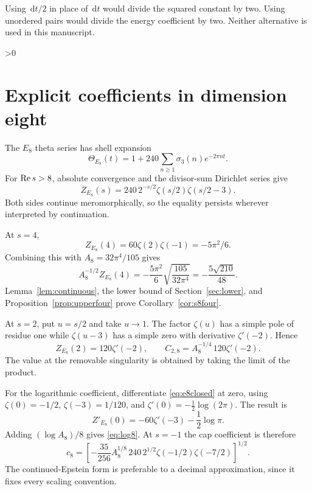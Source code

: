 \documentclass[11pt,a4paper]{article}
\theoremstyle{definition}
\newcommand{\dd}{\,\mathrm d}
\numberwithin{equation}{section}
\let\originalsection\section
\renewcommand{\section}{\ifnum\value{section}>0\clearpage\fi\originalsection}
\begin{document}
Using $\dd t/2$ in place of $\dd t$ would divide the squared constant by two. Using unordered pairs would divide the energy coefficient by two. Neither alternative is used in this manuscript.

\section{Explicit coefficients in dimension eight}\label{sec:coeff8}
The $E_8$ theta series has shell expansion
\begin{equation}
 \Theta_{E_8}(t)=1+240\sum_{n\ge1}\sigma_3(n)e^{-2\pi nt}.
\end{equation}
For $\mathop{\rm Re}s>8$, absolute convergence and the divisor-sum Dirichlet series give
\begin{equation}\label{eq:e8closed}
 Z_{E_8}(s)=240\,2^{-s/2}\zeta(s/2)\zeta(s/2-3).
\end{equation}
Both sides continue meromorphically, so the equality persists wherever interpreted by continuation.

At $s=4$,
\[
 Z_{E_8}(4)=60\zeta(2)\zeta(-1)=-5\pi^2/6.
\]
Combining this with $A_8=32\pi^4/105$ gives
\begin{equation}
 A_8^{-1/2}Z_{E_8}(4)
 =-\frac{5\pi^2}{6}\sqrt{\frac{105}{32\pi^4}}
 =-\frac{5\sqrt{210}}{48}.
\end{equation}
Lemma~\ref{lem:continuous}, the lower bound of Section~\ref{sec:lower}, and Proposition~\ref{prop:upperfour} prove Corollary~\ref{cor:s8four}.

At $s=2$, put $u=s/2$ and take $u\to1$. The factor $\zeta(u)$ has a simple pole of residue one while $\zeta(u-3)$ has a simple zero with derivative $\zeta'(-2)$. Hence
\begin{equation}\label{eq:e8two}
 Z_{E_8}(2)=120\zeta'(-2),\qquad
 C_{2,8}=A_8^{-1/4}\,120\zeta'(-2).
\end{equation}
The value at the removable singularity is obtained by taking the limit of the product.

For the logarithmic coefficient, differentiate \eqref{eq:e8closed} at zero, using $\zeta(0)=-1/2$, $\zeta(-3)=1/120$, and $\zeta'(0)=-\tfrac12\log(2\pi)$. The result is
\begin{equation}
 Z'_{E_8}(0)=-60\zeta'(-3)-\frac12\log\pi.
\end{equation}
Adding $(\log A_8)/8$ gives \eqref{eq:log8}. At $s=-1$ the cap coefficient is therefore
\begin{equation}
 c_8=\left[-\frac{35}{256}A_8^{1/8}
       \,240\,2^{1/2}\zeta(-1/2)\zeta(-7/2)\right]^{1/2}.
\end{equation}
The continued-Epstein form is preferable to a decimal approximation, since it fixes every scaling convention.
\end{document}
